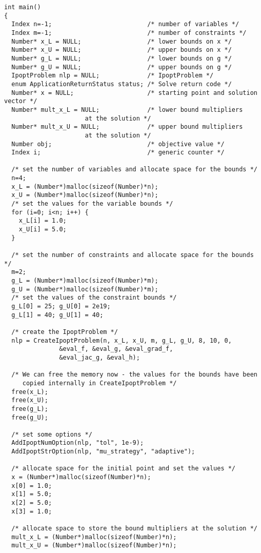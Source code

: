 \documentclass[10pt]{article}
\begin{document}
\begin{footnotesize}
\begin{verbatim}
int main()
{
  Index n=-1;                          /* number of variables */
  Index m=-1;                          /* number of constraints */
  Number* x_L = NULL;                  /* lower bounds on x */
  Number* x_U = NULL;                  /* upper bounds on x */
  Number* g_L = NULL;                  /* lower bounds on g */
  Number* g_U = NULL;                  /* upper bounds on g */
  IpoptProblem nlp = NULL;             /* IpoptProblem */
  enum ApplicationReturnStatus status; /* Solve return code */
  Number* x = NULL;                    /* starting point and solution vector */
  Number* mult_x_L = NULL;             /* lower bound multipliers 
					  at the solution */
  Number* mult_x_U = NULL;             /* upper bound multipliers 
					  at the solution */
  Number obj;                          /* objective value */
  Index i;                             /* generic counter */
  
  /* set the number of variables and allocate space for the bounds */
  n=4;
  x_L = (Number*)malloc(sizeof(Number)*n);
  x_U = (Number*)malloc(sizeof(Number)*n);
  /* set the values for the variable bounds */
  for (i=0; i<n; i++) {
    x_L[i] = 1.0;
    x_U[i] = 5.0;
  }

  /* set the number of constraints and allocate space for the bounds */
  m=2;
  g_L = (Number*)malloc(sizeof(Number)*m);
  g_U = (Number*)malloc(sizeof(Number)*m);
  /* set the values of the constraint bounds */
  g_L[0] = 25; g_U[0] = 2e19;
  g_L[1] = 40; g_U[1] = 40;

  /* create the IpoptProblem */
  nlp = CreateIpoptProblem(n, x_L, x_U, m, g_L, g_U, 8, 10, 0, 
			   &eval_f, &eval_g, &eval_grad_f, 
			   &eval_jac_g, &eval_h);
  
  /* We can free the memory now - the values for the bounds have been
     copied internally in CreateIpoptProblem */
  free(x_L);
  free(x_U);
  free(g_L);
  free(g_U);

  /* set some options */
  AddIpoptNumOption(nlp, "tol", 1e-9);
  AddIpoptStrOption(nlp, "mu_strategy", "adaptive");

  /* allocate space for the initial point and set the values */
  x = (Number*)malloc(sizeof(Number)*n);
  x[0] = 1.0;
  x[1] = 5.0;
  x[2] = 5.0;
  x[3] = 1.0;

  /* allocate space to store the bound multipliers at the solution */
  mult_x_L = (Number*)malloc(sizeof(Number)*n);
  mult_x_U = (Number*)malloc(sizeof(Number)*n);


\end{verbatim}
\end{footnotesize}
\end{document}
